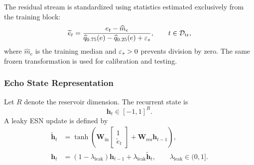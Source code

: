 \documentclass[review,number,sort&compress]{elsarticle}
\begin{document}
The residual stream is standardized using statistics estimated exclusively
from the training block:
\begin{equation}
    \widetilde{e}_t
    =
    \frac{e_t-\widehat{m}_{e}}
    {\widehat{q}_{0.75}(e)-\widehat{q}_{0.25}(e)+\varepsilon_s},
    \qquad
    t\in\mathcal{D}_{\mathrm{tr}},
    \label{eq:residual_scaling}
\end{equation}
where $\widehat{m}_{e}$ is the training median and $\varepsilon_s>0$ prevents division
by zero. The same frozen transformation is used for calibration and testing.

\subsubsection{Echo State Representation}

Let $R$ denote the reservoir dimension. The recurrent state is
\begin{equation}
    \bm{h}_t
    \in
    [-1,1]^R.
\end{equation}
A leaky ESN update is defined by
\begin{align}
    \widetilde{\bm{h}}_t
    &=
    \tanh
    \left(
        \bm{W}_{\mathrm{in}}
        \begin{bmatrix}
            1\\
            \widetilde{e}_t
        \end{bmatrix}
        +
        \bm{W}_{\mathrm{res}}\bm{h}_{t-1}
    \right),
    \label{eq:esn_candidate}
    \\
    \bm{h}_t
    &=
    (1-\lambda_{\mathrm{leak}})\bm{h}_{t-1}
    +
    \lambda_{\mathrm{leak}}\widetilde{\bm{h}}_t,
    \qquad
    \lambda_{\mathrm{leak}}\in(0,1].
    \label{eq:esn_state}
\end{align}
\end{document}
